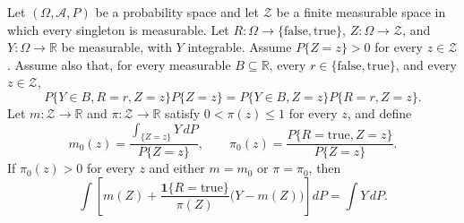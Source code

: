 \begin{theorem}
Let $(\Omega,\mathcal A,P)$ be a probability space and let $\mathcal Z$ be
a finite measurable space in which every singleton is measurable.  Let
$R:\Omega\to\{\mathrm{false},\mathrm{true}\}$,
$Z:\Omega\to\mathcal Z$, and $Y:\Omega\to\mathbb R$ be measurable,
with $Y$ integrable.  Assume $P\{Z=z\}>0$ for every $z\in\mathcal Z$.
Assume also that, for every measurable $B\subseteq\mathbb R$, every
$r\in\{\mathrm{false},\mathrm{true}\}$, and every $z\in\mathcal Z$,
\[
 P\{Y\in B,R=r,Z=z\}P\{Z=z\}
 =
 P\{Y\in B,Z=z\}P\{R=r,Z=z\}.
\]
Let $m:\mathcal Z\to\mathbb R$ and
$\pi:\mathcal Z\to\mathbb R$ satisfy $0<\pi(z)\le1$ for every $z$, and
define
\[
 m_0(z)=\frac{\int_{\{Z=z\}}Y\,dP}{P\{Z=z\}},
 \qquad
 \pi_0(z)=\frac{P\{R=\mathrm{true},Z=z\}}{P\{Z=z\}}.
\]
If $\pi_0(z)>0$ for every $z$ and either $m=m_0$ or $\pi=\pi_0$, then
\[
 \int\left[
 m(Z)+\frac{\mathbf 1\{R=\mathrm{true}\}}{\pi(Z)}
       \bigl(Y-m(Z)\bigr)
 \right]dP
 =
 \int Y\,dP.
\]
\end{theorem}
